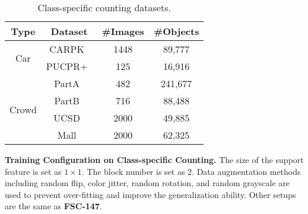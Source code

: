 \documentclass[10pt,twocolumn,letterpaper]{article}
\begin{document}
\begin{table}[h]
\begin{minipage}[t]{0.5\textwidth}
\setlength\tabcolsep{6pt}
\centering
\scriptsize
\caption{Class-specific counting datasets.}
\vspace{5pt}
\begin{threeparttable}
\begin{tabular}{cccc}
\toprule
Type & Dataset & \#Images & \#Objects \\
\midrule
\multirow{2}{*}{Car}
& CARPK~\cite{lpn} & 1448 & 89,777 \\
& PUCPR+~\cite{lpn} & 125 & 16,916 \\
\midrule
\multirow{4}{*}{Crowd}
& PartA~\cite{mcnn} & 482 & 241,677 \\
& PartB~\cite{mcnn} & 716 & 88,488 \\
& UCSD~\cite{ucsd} & 2000 & 49,885 \\
& Mall~\cite{mall} & 2000 & 62,325 \\
\bottomrule
\end{tabular}
\end{threeparttable}
\label{appendix:tab:datasets}
\end{minipage}
\end{table}


\vspace{2pt}\noindent\textbf{Training Configuration on Class-specific Counting.}
The size of the support feature is set as $1 \times 1$. 
The block number is set as 2. 
Data augmentation methods including random flip, color jitter, random rotation, and random grayscale are used to prevent over-fitting and improve the generalization ability. 
Other setups are the same as \textbf{FSC-147}. 
\end{document}
